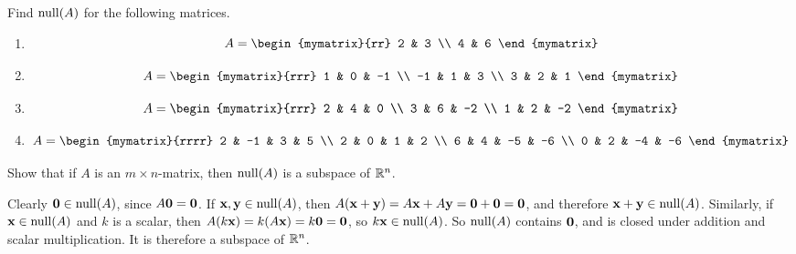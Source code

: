 \begin{ex}
  Find $\nullspace(A)$ for the following matrices. 
  \begin{enumerate}
  \item 
    \begin{equation*}
      A = \begin{mymatrix}{rr}
        2 & 3 \\
        4 & 6 
      \end{mymatrix}
    \end{equation*}
  \item
    \begin{equation*}
      A = \begin{mymatrix}{rrr}
        1 & 0 & -1 \\
        -1 & 1 & 3 \\
        3 & 2 & 1 
      \end{mymatrix}
    \end{equation*}
  \item 
    \begin{equation*}
      A = \begin{mymatrix}{rrr}
        2 & 4 & 0 \\
        3 & 6 & -2 \\
        1 & 2 & -2
      \end{mymatrix}
    \end{equation*}
  \item 
    \begin{equation*}
      A = \begin{mymatrix}{rrrr}
        2 & -1 & 3 & 5 \\
        2 & 0 & 1 & 2 \\
        6 & 4 & -5 & -6 \\
        0 & 2 & -4 & -6 
      \end{mymatrix}
    \end{equation*}
  \end{enumerate}
\end{ex}

\begin{ex}
  Show that if $A$ is an $m\times n$-matrix, then $\nullspace(A)$
  is a subspace of $\mathbb{R}^n$.
  \begin{sol}
    Clearly $\vect{0}\in\nullspace(A)$, since $A\mbox{\bf 0}=\mbox{\bf 0}$.
    If $\vect{x},\vect{y}\in\nullspace(A)$, then
    $A(\mbox{\bf x}+\mbox{\bf y}) = A\mbox{\bf x}+A\mbox{\bf y} = \mbox{\bf 0}
    +\mbox{\bf 0}=\mbox{\bf 0}$, and therefore
    $\vect{x}+\vect{y}\in\nullspace(A)$. Similarly, if
    $\vect{x}\in\nullspace(A)$ and $k$ is a scalar, then
    $A(k\mbox{\bf x})=k(A\mbox{\bf x})=k\mbox{\bf 0}=\mbox{\bf 0}$, so
    $k\vect{x}\in\nullspace(A)$. So $\nullspace(A)$ contains
    $\mbox{\bf 0}$, and is closed under addition and scalar
    multiplication. It is therefore a subspace of $\mathbb{R}^n$. 
  \end{sol}
\end{ex}

